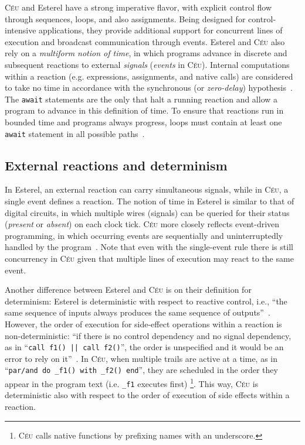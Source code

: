 \documentclass{acm_proc_article-sp}
\newcommand{\CEU}{\textsc{C\'{e}u}\xspace}
\newcommand{\code}[1] {{\small{\texttt{#1}}}}
\newcommand{\1}{\;}
\newcommand{\2}{\;\;}
\newcommand{\3}{\;\;\;}
\newcommand{\5}{\;\;\;\;\;}
\begin{document}
\CEU and Esterel have a strong imperative flavor, with explicit control flow 
through sequences, loops, and also assignments.
Being designed for control-intensive applications, they provide additional 
support for concurrent lines of execution and broadcast communication through 
events.
%
Esterel and \CEU also rely on a \emph{multiform notion of time}, in which 
programs advance in discrete and subsequent reactions to external 
\emph{signals} (\emph{events} in \CEU).
Internal computations within a reaction (e.g. expressions, assignments, and 
native calls) are considered to take no time in accordance with the synchronous 
(or \emph{zero-delay}) hypothesis~\cite{rp.hypothesis}.
The \code{await} statements are the only that halt a running reaction and allow 
a program to advance in this definition of time.
%
To ensure that reactions run in bounded time and programs always progress, 
loops must contain at least one \code{await} statement in all possible 
paths~\cite{ceu.sensys,esterel.primer}.

\subsection{External reactions and determinism}

In Esterel, an external reaction can carry simultaneous signals, while in \CEU, 
a single event defines a reaction.
%
The notion of time in Esterel is similar to that of digital circuits, in which 
multiple wires (signals) can be queried for their status (\emph{present} or 
\emph{absent}) on each clock tick.
%
\CEU more closely reflects event-driven programming, in which occurring events 
are sequentially and uninterruptedly handled by the program~\cite{EVT1,EVT2}.
%
Note that even with the single-event rule there is still concurrency in \CEU 
given that multiple lines of execution may react to the same event.

Another difference between Esterel and \CEU is on their definition for 
determinism:
%
Esterel is deterministic with respect to reactive control, i.e., ``the same 
sequence of inputs always produces the same sequence of 
outputs''~\cite{esterel.primer}.
However, the order of execution for side-effect operations within a reaction is 
non-deterministic: ``if there is no control dependency and no signal 
dependency, as in ``\code{call f1() || call f2()}'', the order is unspecified 
and it would be an error to rely on it''~\cite{esterel.primer}.
%
In \CEU, when multiple trails are active at a time, as in
``\code{par/and~do~\_f1()~with~\_f2()~end}'', they are scheduled in the order 
they appear in the program text (i.e. \code{\_f1} executes first)%
\footnote{
\CEU calls native functions by prefixing names with an underscore.
}.
%
This way, \CEU is deterministic also with respect to the order of execution of 
side effects within a reaction.
\end{document}
